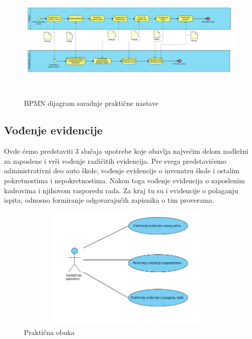 \begin{figure}[H]
    \begin{center}
        \includegraphics[width=120mm, height=60mm]{Diagrams/bpmnS_prakticna_nastava.png}
    \end{center}
    \caption {BPMN dijagram saradnje praktične nastave}
    \label{fig:bpmnS_podnosenje_zahteva}

\end{figure}

\subsection {Vođenje evidencije}
Ovde ćemo predstaviti 3 slučaja upotrebe koje obavlja najvećim delom  nadležni za zaposlene i vrši vođenje različitih evidencija.
Pre svega predstavićemo administrativni deo auto škole, vođenje evidencije o invenatru škole i ostalim pokretnostima i nepokretnostima.
Nakon toga vođenje evidencija o zaposlenim kadrovima i njihovom rasporedu rada. Za kraj tu su i evidencije o polaganju ispita, odnosno formiranje 
odgovarajućih zapisnika o tim proverama.

\begin{figure}[H]
    \begin{center}
        \includegraphics[width=120mm, height=60mm]{Diagrams/evidencija.png}
    \end{center}
    \caption {Praktična obuka}
    \label{usecase_praktična obuka}

\end{figure}

